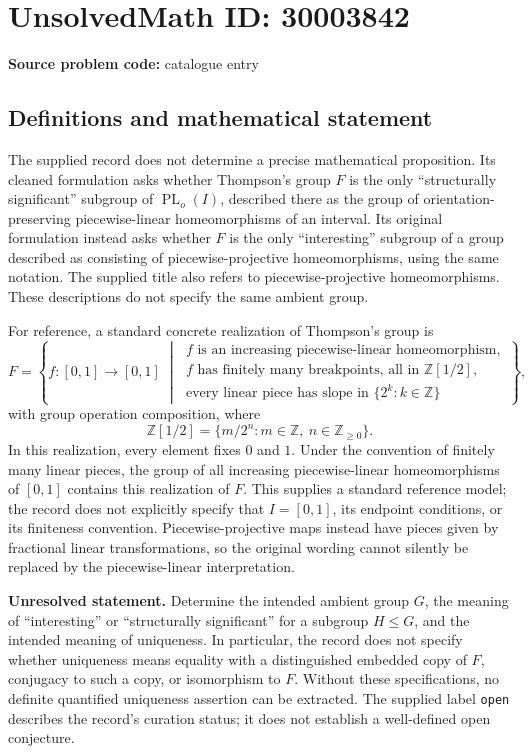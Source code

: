 \documentclass[11pt]{article}
\begin{document}
\section*{UnsolvedMath ID: 30003842}
\textbf{Source problem code:} catalogue entry
\subsection{Definitions and mathematical statement}
The supplied record does not determine a precise mathematical proposition. Its cleaned formulation asks whether Thompson's group \(F\) is the only ``structurally significant'' subgroup of \(\operatorname{PL}_o(I)\), described there as the group of orientation-preserving piecewise-linear homeomorphisms of an interval. Its original formulation instead asks whether \(F\) is the only ``interesting'' subgroup of a group described as consisting of piecewise-projective homeomorphisms, using the same notation. The supplied title also refers to piecewise-projective homeomorphisms. These descriptions do not specify the same ambient group.

For reference, a standard concrete realization of Thompson's group is
\[
F=\left\{f\colon[0,1]\longrightarrow[0,1]\;\middle|\;
\begin{array}{l}
f\text{ is an increasing piecewise-linear homeomorphism},\\
f\text{ has finitely many breakpoints, all in }\mathbb Z[1/2],\\
\text{every linear piece has slope in }\{2^k:k\in\mathbb Z\}
\end{array}\right\},
\]
with group operation composition, where
\[
\mathbb Z[1/2]=\{m/2^n:m\in\mathbb Z,\ n\in\mathbb Z_{\geq 0}\}.
\]
In this realization, every element fixes \(0\) and \(1\). Under the convention of finitely many linear pieces, the group of all increasing piecewise-linear homeomorphisms of \([0,1]\) contains this realization of \(F\). This supplies a standard reference model; the record does not explicitly specify that \(I=[0,1]\), its endpoint conditions, or its finiteness convention. Piecewise-projective maps instead have pieces given by fractional linear transformations, so the original wording cannot silently be replaced by the piecewise-linear interpretation.

\textbf{Unresolved statement.} Determine the intended ambient group \(G\), the meaning of ``interesting'' or ``structurally significant'' for a subgroup \(H\leq G\), and the intended meaning of uniqueness. In particular, the record does not specify whether uniqueness means equality with a distinguished embedded copy of \(F\), conjugacy to such a copy, or isomorphism to \(F\). Without these specifications, no definite quantified uniqueness assertion can be extracted. The supplied label \texttt{open} describes the record's curation status; it does not establish a well-defined open conjecture.
\end{document}
